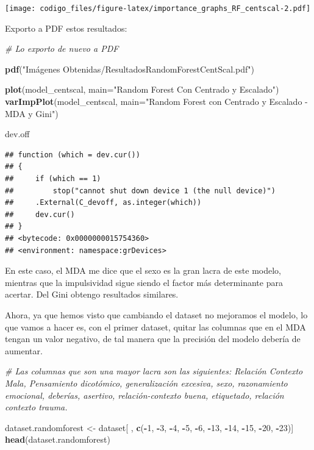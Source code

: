 \documentclass[]{article}
\newenvironment{Shaded}{\begin{snugshade}}{\end{snugshade}}
\newcommand{\KeywordTok}[1]{\textcolor[rgb]{0.13,0.29,0.53}{\textbf{#1}}}
\newcommand{\DataTypeTok}[1]{\textcolor[rgb]{0.13,0.29,0.53}{#1}}
\newcommand{\DecValTok}[1]{\textcolor[rgb]{0.00,0.00,0.81}{#1}}
\newcommand{\StringTok}[1]{\textcolor[rgb]{0.31,0.60,0.02}{#1}}
\newcommand{\CommentTok}[1]{\textcolor[rgb]{0.56,0.35,0.01}{\textit{#1}}}
\newcommand{\OperatorTok}[1]{\textcolor[rgb]{0.81,0.36,0.00}{\textbf{#1}}}
\newcommand{\NormalTok}[1]{#1}
\begin{document}
\texttt{[image: codigo\_files/figure-latex/importance\_graphs\_RF\_centscal-2.pdf]}

Exporto a PDF estos resultados:

\begin{Shaded}
\begin{Highlighting}[]
\CommentTok{# Lo exporto de nuevo a PDF}

\KeywordTok{pdf}\NormalTok{(}\StringTok{"Imágenes Obtenidas/ResultadosRandomForestCentScal.pdf"}\NormalTok{)}

\KeywordTok{plot}\NormalTok{(model_centscal, }\DataTypeTok{main=}\StringTok{"Random Forest Con Centrado y Escalado"}\NormalTok{)}
\KeywordTok{varImpPlot}\NormalTok{(model_centscal, }\DataTypeTok{main=}\StringTok{"Random Forest con Centrado y Escalado - MDA y Gini"}\NormalTok{)}

\NormalTok{dev.off}
\end{Highlighting}
\end{Shaded}

\begin{verbatim}
## function (which = dev.cur()) 
## {
##     if (which == 1) 
##         stop("cannot shut down device 1 (the null device)")
##     .External(C_devoff, as.integer(which))
##     dev.cur()
## }
## <bytecode: 0x0000000015754360>
## <environment: namespace:grDevices>
\end{verbatim}

En este caso, el MDA me dice que el sexo es la gran lacra de este
modelo, mientras que la impulsividad sigue siendo el factor más
determinante para acertar. Del Gini obtengo resultados similares.

Ahora, ya que hemos visto que cambiando el dataset no mejoramos el
modelo, lo que vamos a hacer es, con el primer dataset, quitar las
columnas que en el MDA tengan un valor negativo, de tal manera que la
precisión del modelo debería de aumentar.

\begin{Shaded}
\begin{Highlighting}[]
\CommentTok{# Las columnas que son una mayor lacra son las siguientes: Relación Contexto Mala, Pensamiento dicotómico, generalización excesiva, sexo, razonamiento emocional, deberías, asertivo, relación-contexto buena, etiquetado, relación contexto trauma.}

\NormalTok{dataset.randomforest <-}\StringTok{ }\NormalTok{dataset[ , }\KeywordTok{c}\NormalTok{(}\OperatorTok{-}\DecValTok{1}\NormalTok{, }\OperatorTok{-}\DecValTok{3}\NormalTok{, }\OperatorTok{-}\DecValTok{4}\NormalTok{, }\OperatorTok{-}\DecValTok{5}\NormalTok{, }\OperatorTok{-}\DecValTok{6}\NormalTok{, }\OperatorTok{-}\DecValTok{13}\NormalTok{, }\OperatorTok{-}\DecValTok{14}\NormalTok{, }\OperatorTok{-}\DecValTok{15}\NormalTok{, }\OperatorTok{-}\DecValTok{20}\NormalTok{, }\OperatorTok{-}\DecValTok{23}\NormalTok{)]}
\KeywordTok{head}\NormalTok{(dataset.randomforest)}
\end{Highlighting}
\end{Shaded}
\end{document}
